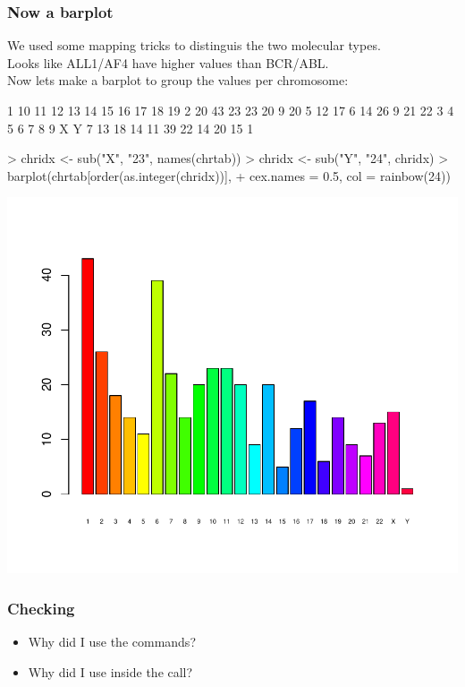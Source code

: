\begin{frame}
  \frametitle{Now a barplot}
  We used some mapping tricks to distinguis the two molecular types. \\ Looks like ALL1/AF4 have higher values than BCR/ABL. \\ Now lets make a barplot to group the values per chromosome:
\begin{Schunk}
\begin{Soutput}
 1 10 11 12 13 14 15 16 17 18 19  2 20 
43 23 23 20  9 20  5 12 17  6 14 26  9 
21 22  3  4  5  6  7  8  9  X  Y 
 7 13 18 14 11 39 22 14 20 15  1 
\end{Soutput}
\begin{Sinput}
> chridx <- sub("X", "23", names(chrtab))
> chridx <- sub("Y", "24", chridx)
> barplot(chrtab[order(as.integer(chridx))], 
+     cex.names = 0.5, col = rainbow(24))
\end{Sinput}
\end{Schunk}
\includegraphics{plots/fig-017}
\end{frame}

\begin{frame}[allowframebreaks]
  \frametitle{Checking}
  \begin{itemize}
  \item Why did I use the  commands?
  \item Why did I use  inside the  call?
  \end{itemize}
\end{frame}

